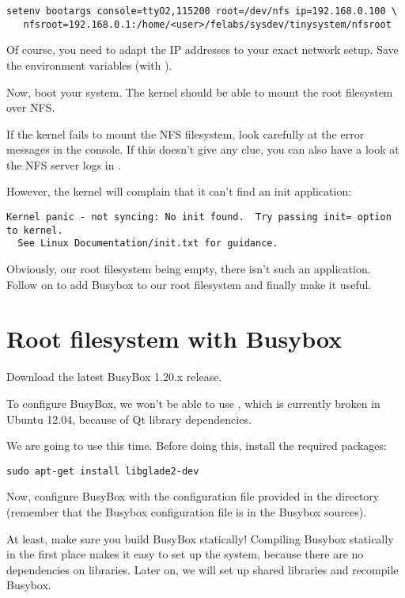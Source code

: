 \footnotesize
\begin{verbatim}
setenv bootargs console=ttyO2,115200 root=/dev/nfs ip=192.168.0.100 \
   nfsroot=192.168.0.1:/home/<user>/felabs/sysdev/tinysystem/nfsroot
\end{verbatim}
\normalsize

Of course, you need to adapt the IP addresses to your exact network
setup. Save the environment variables (with \code{saveenv}).

Now, boot your system. The kernel should be able to mount the root
filesystem over NFS.

If the kernel fails to mount the NFS filesystem, look carefully at the
error messages in the console. If this doesn't give any clue, you can
also have a look at the NFS server logs in \code{/var/log/syslog}.

However, the kernel will complain that it can't find an init
application:

\footnotesize
\begin{verbatim}
Kernel panic - not syncing: No init found.  Try passing init= option to kernel.
  See Linux Documentation/init.txt for guidance.
\end{verbatim}
\normalsize

Obviously, our root filesystem being empty, there isn't such an
application. Follow on to add Busybox to our root filesystem and
finally make it useful.

\section{Root filesystem with Busybox}

Download the latest BusyBox 1.20.x release.

To configure BusyBox, we won't be able to use ,
which is currently broken in Ubuntu 12.04, because of Qt library
dependencies.

We are going to use  this time. Before doing this,
install the required packages:

\begin{verbatim}
sudo apt-get install libglade2-dev
\end{verbatim}

Now, configure BusyBox with the configuration file provided in the
\code{data/} directory (remember that the Busybox configuration file
is \code{.config} in the Busybox sources).

At least, make sure you build BusyBox statically! Compiling Busybox
statically in the first place makes it easy to set up the system,
because there are no dependencies on libraries. Later on, we will set
up shared libraries and recompile Busybox.

